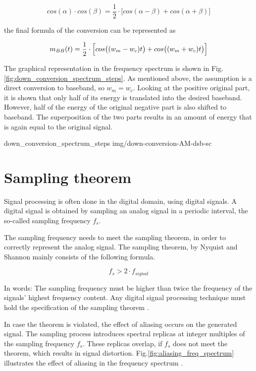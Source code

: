 \begin{equation}
  cos(\alpha) \cdot cos(\beta) = \frac{1}{2} \cdot \bigl[ cos(\alpha-\beta) + cos(\alpha+\beta) \bigr]
\end{equation}

the final formula of the conversion can be represented as

\begin{equation}
 m_{BB}(t) = \frac{1}{2} \cdot \Bigl[ cos\bigl((w_m-w_c)t\bigr) + cos\bigl((w_m+w_c)t\bigr) \Bigr]
\end{equation}

The graphical representation in the frequency spectrum is shown in Fig.\ref{fig:down_conversion_spectrum_steps}.
As mentioned above, the assumption is a direct conversion to baseband, so $w_m = w_c$.
Looking at the positive original part, it is shown that only half of its energy is translated into the desired baseband.
However, half of the energy of the original negative part is also shifted to baseband.
The superposition of the two parts results in an amount of energy that is again equal to the original signal.

 {down_conversion_spectrum_steps} {img/down-conversion-AM-dsb-sc}


\section{Sampling theorem}

Signal processing is often done in the digital domain, using digital signals.
A digital signal is obtained by sampling an analog signal in a periodic interval, the so-called sampling frequency $f_s$.

The sampling frequency needs to meet the sampling theorem, in order to correctly represent the analog signal.
The sampling theorem, by Nyquist and Shannon mainly consists of the following formula.

\begin{equation}
  f_{s} > 2 \cdot f_{signal}
\end{equation}

In words: The sampling frequency must be higher than twice the frequency of the signals' highest frequency content.
Any digital signal processing technique must hold the specification of the sampling theorem \cite[chpt. 4.2]{AlessioSilviaMaria2016DSPa}.

In case the theorem is violated, the effect of aliasing occurs on the generated signal.
The sampling process introduces spectral replicas at integer multiples of the sampling frequency $f_s$.
These replicas overlap, if $f_s$ does not meet the theorem, which results in signal distortion.
Fig.\ref{fig:aliasing_freq_spectrum} illustrates the effect of aliasing in the frequency spectrum \cite{ThyagarajanK.S2019ItDS}.

